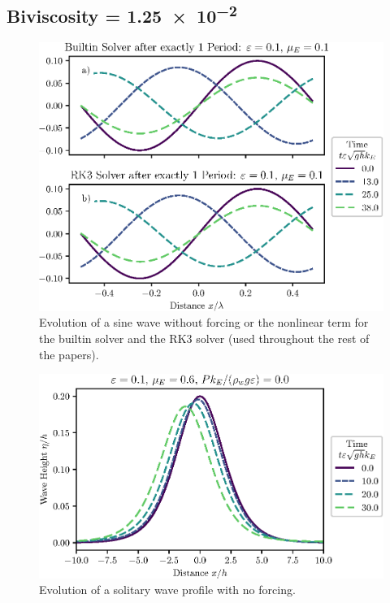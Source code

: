 \documentclass{jfm}
\let\Oldsubsection\subsection
\renewcommand{\subsection}{\FloatBarrier\Oldsubsection}
\begin{document}
\subsection{Biviscosity = \num{1.25e-2}}
\begin{figure}
  \centering
  \includegraphics{TrigVerf.eps}
  \caption{
    Evolution of a sine wave without forcing or the nonlinear term for
    the builtin solver and the RK3 solver (used throughout the rest of
    the papers).
  }
\end{figure}

\begin{figure}
  \centering
  \includegraphics{Long-Run.eps}
  \caption{
    Evolution of a solitary wave profile with no forcing.
  }
\end{figure}
\end{document}

